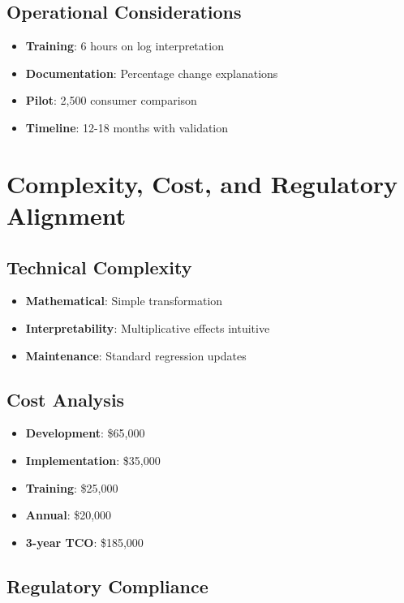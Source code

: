 \subsection{Operational Considerations}

\begin{itemize}
    \item \textbf{Training}: 6 hours on log interpretation
    \item \textbf{Documentation}: Percentage change explanations
    \item \textbf{Pilot}: 2,500 consumer comparison
    \item \textbf{Timeline}: 12-18 months with validation
\end{itemize}

\section{Complexity, Cost, and Regulatory Alignment}

\subsection{Technical Complexity}

\begin{itemize}
    \item \textbf{Mathematical}: Simple transformation
    \item \textbf{Interpretability}: Multiplicative effects intuitive
    \item \textbf{Maintenance}: Standard regression updates
\end{itemize}

\subsection{Cost Analysis}

\begin{itemize}
    \item \textbf{Development}: \$65,000
    \item \textbf{Implementation}: \$35,000  
    \item \textbf{Training}: \$25,000
    \item \textbf{Annual}: \$20,000
    \item \textbf{3-year TCO}: \$185,000
\end{itemize}

\subsection{Regulatory Compliance}

